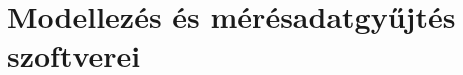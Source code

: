 \documentclass[../main.tex]{subfiles}
\begin{document}
\chapter{Modellezés és mérésadatgyűjtés szoftverei}























\end{document}
